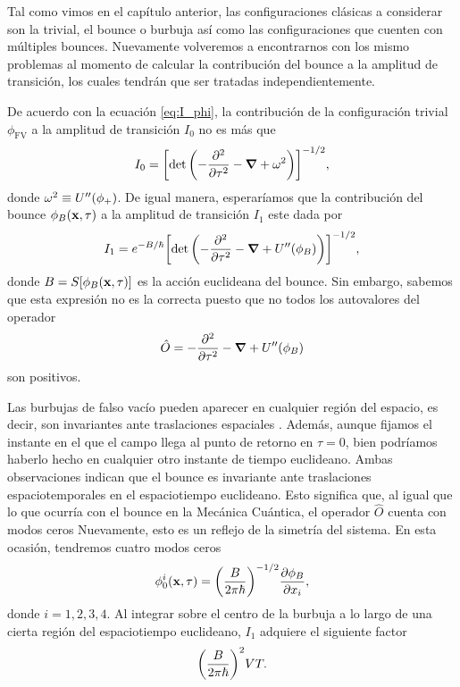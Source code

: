 Tal como vimos en el capítulo 
anterior, las configuraciones clásicas a considerar son la trivial, el bounce o burbuja así como las configuraciones que cuenten con múltiples bounces. Nuevamente volveremos a encontrarnos con los mismo problemas al momento de calcular la contribución del bounce a la amplitud de transición, los cuales tendrán que ser tratadas independientemente. 

De acuerdo con la ecuación \eqref{eq:I_phi}, la contribución de la configuración trivial $\phi_{\text{FV}}$ a la amplitud de transición $I_0$ no es más que
\begin{equation}
	I_0 = \qty[ \det\qty(-\pdv[2]{\tau} -\grad{} + \omega^2) ]^{-1/2},
\end{equation}
donde $\omega^2 \equiv U''\qty(\phi_+)$. De igual manera, esperaríamos que la contribución del bounce $\phi_B\qty(\vb{x}, \tau)$ a la amplitud de transición $I_1$ este dada por 
\begin{equation}
I_1 = e^{-B / \hbar} \qty[ \det\qty(-\pdv[2]{\tau} -\grad{} + U''\qty(\phi_B) ) ]^{-1/2},
\end{equation}
donde $B = S[\phi_B\qty(\vb{x}, \tau)]$ es la acción euclideana del bounce. Sin embargo, sabemos que esta expresión no es la correcta puesto que no todos los autovalores del operador
\begin{equation}
	\hat{O} = -\pdv[2]{\tau} -\grad{} + U''\qty(\phi_B)
\end{equation}
son positivos. 

Las burbujas de falso vacío pueden aparecer en cualquier región del espacio, es decir, son invariantes ante traslaciones espaciales \cite{coleman1977fate}. Además, aunque fijamos el instante en el que el campo llega al punto de retorno en $\tau = 0$, bien podríamos haberlo hecho en cualquier otro instante de tiempo euclideano. Ambas observaciones indican que el bounce es invariante ante traslaciones espaciotemporales en el espaciotiempo euclideano. Esto significa que, al igual que lo que ocurría con el bounce en la Mecánica Cuántica, el operador $\hat{O}$ cuenta con modos ceros 
Nuevamente, esto es un reflejo de la simetría del sistema. 
En esta ocasión, tendremos cuatro modos ceros
\begin{equation}
	\phi_0^i\qty(\vb{x}, \tau) = \qty(\frac{B}{2\pi\hbar})^{-1/2}\pdv{\phi_B}{x_i},
\end{equation}
donde $i = 1, 2, 3, 4$. Al 
integrar sobre el centro de la burbuja a lo largo de una cierta región del espaciotiempo euclideano, 
$I_1$ adquiere el siguiente factor
\begin{equation}
	\qty(\frac{B}{2\pi\hbar})^{2}VT.
\end{equation}

